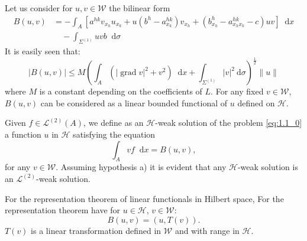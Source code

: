 \documentclass[a4paper,12pt,leqno]{article}
\numberwithin{equation}{section}
\newcommand{\dd}{\mathop{}\!\mathrm{d}}
\begin{document}
Let us consider for $u, v \in \mathscr{W}$ the bilinear form
\begin{equation*}
	\begin{split}
		B(u, v) & = -\int_{A} \left[a^{h k} v_{x_{h}} u_{x_{k}}+u\left(b^{h}-a_{x_{k}}^{h k}\right) v_{x_{h}}+\left(b_{x_{h}}^{h}-a_{x_{h} x_{k}}^{h k}-c\right) u v\right] \dd x \\
		& \quad -\int_{\Sigma^{(1)}} u v b \dd \sigma 
	\end{split}
\end{equation*}
It is easily seen that:
\begin{equation*}
	|B(u, v)| \leq M\left(\int_{A}\left(|\operatorname{grad} v|^2+v^{2}\right) \dd x+\int_{\Sigma^{(1)}}|v|^{2} \mathrm{~d} \sigma\right)^{\frac{1}{2}} \|u\|
\end{equation*}
where $M$ is a constant depending on the coefficients of $L$. For any fixed $v \in \mathscr{W}$, $B(u, v)$ can be considered as a linear bounded functional of $u$ defined on $\mathscr{H}$.

Given $f \in \mathscr{L}^{(2)}(A)$, we define as an $\mathscr{H}$-weak solution of the problem \eqref{eq:1.1_0} a function $u$ in $\mathscr{H}$ satisfying the equation
\begin{equation*}
	\int_{A} v f \dd x = B(u, v),
\end{equation*}
for any $v \in \mathscr{W}$. Assuming hypothesis a) it is evident that any $\mathscr{H}$-weak solution is an $\mathscr{L}^{(2)}$-weak solution. 

For the representation theorem of linear functionals in Hilbert space, For the representation theorem have for $u \in \mathscr{H}$, $v \in \mathscr{W}$:
\begin{equation*}
	B(u, v)=(u, T(v)).
\end{equation*}
${T}(v)$ is a linear transformation defined in $\mathscr{W}$ and with range in $\mathscr{H}$.
\end{document}
